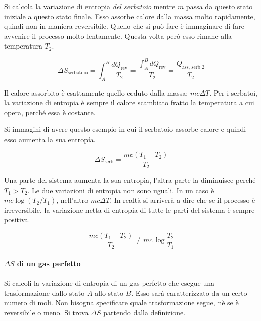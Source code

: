 \begin{figure}[htpb]
\end{figure}
\FloatBarrier
Si calcola la variazione di entropia \emph{del serbatoio} mentre $m$ passa da questo stato iniziale a questo stato finale. Esso assorbe calore dalla massa molto rapidamente, quindi non in maniera reversibile. Quello che si può fare è immaginare di fare avvenire il processo molto lentamente. Questa volta però esso rimane alla temperatura $T_2$.

\[
	\Delta S_{\text{serbatoio}} = \int_A^B \frac{dQ_{\text{rev}} }{T_2} = \frac{\int_A^B dQ_{\text{rev} } }{T_2 } = \frac{Q_{\text{ass, serb }2 } }{T_2}
\]

Il calore assorbito è esattamente quello ceduto dalla massa: $mc\Delta T$. Per i serbatoi, la variazione di entropia è sempre il calore scambiato fratto la temperatura a cui opera, perché essa è costante.

Si immagini di avere questo esempio in cui il serbatoio assorbe calore e quindi esso aumenta la sua entropia.

\[
	\Delta S_{\text{serb} } = \frac{mc(T_1-T_2)}{T_2}
\]

Una parte del sistema aumenta la sua entropia, l'altra parte la diminuisce perché $T_1>T_2$. Le due variazioni di entropia non sono uguali. In un caso è $mc\log(T_2/T_1)$, nell'altro $mc\Delta T$. In realtà si arriverà a dire che se il processo è irreversibile, la variazione netta di entropia di tutte le parti del sistema è sempre positiva.

\[
	\frac{mc(T_1-T_2  )}{T_2 } \neq mc\,\log \frac{T_2 }{T_1}
\]

\paragraph{ $\Delta S$ di un gas perfetto} Si calcoli la variazione di entropia di un gas perfetto che esegue una trasformazione dallo stato $A$ allo stato $B$. Esso sarà caratterizzato da un certo numero di moli. Non bisogna specificare quale trasformazione segue, nè se è reversibile o meno. Si trova $\Delta S$ partendo dalla definizione.

